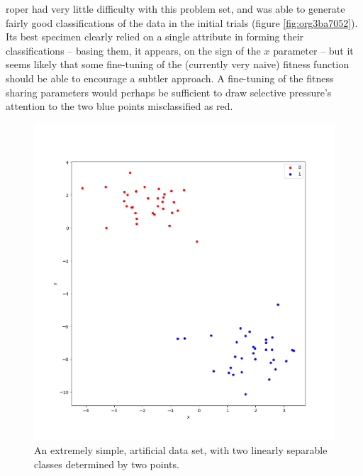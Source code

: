 \documentclass[12pt,glossary]{dalthesis}
\begin{document}
\gls{roper} had very little difficulty with this problem set, and was able to
generate fairly good classifications of the data in the initial trials (figure 
\ref{fig:org3ba7052}). Its best specimen clearly relied on a single
attribute in forming their classifications -- basing them, it appears, on the
sign of the \(x\) parameter -- but it seems likely that some fine-tuning of the
(currently very naive) fitness function should be able to encourage a subtler
approach. A fine-tuning of the fitness sharing parameters would perhaps be
sufficient to draw selective pressure's attention to the two blue points
misclassified as red.

\begin{figure}[htbp]
\centering
\includegraphics[width=.9\linewidth]{../images/plots/2_simple_blobs.png}
\caption{\label{fig:org9170018}
An extremely simple, artificial data set, with two linearly separable classes determined by two points.}
\end{figure}
\end{document}
